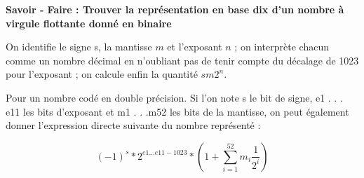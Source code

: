 \documentclass[10pt,fleqn]{article} %
\begin{document}
\begin{savoir}
\textbf{Savoir - Faire :  Trouver la représentation en base dix d’un nombre à virgule
flottante donné en binaire}

On identifie le signe s, la mantisse $m$ et l'exposant $n$ ; on interprète chacun comme
un nombre décimal en n'oubliant pas de tenir compte du décalage de 1023 pour l'exposant
; on calcule enfin la quantité $sm2^n$.

Pour un nombre codé en double précision. Si l'on note s le bit de signe, e1 . . . e11 les bits d’exposant et m1 . . .m52 les bits de la
mantisse, on peut également donner l’expression directe suivante du nombre représenté
:

$$ (-1)^s * 2^{e1...e11 -1023} * \left(1+\sum_{i=1}^{52} m_i \frac{1}{2^i} \right)$$
\end{savoir}
\end{document}
